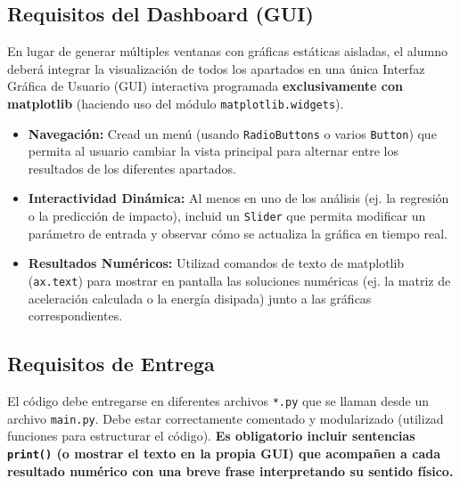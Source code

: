 	\subsection*{Requisitos del Dashboard (GUI)}
	En lugar de generar múltiples ventanas con gráficas estáticas aisladas, el alumno deberá integrar la visualización de todos los apartados en una única Interfaz Gráfica de Usuario (GUI) interactiva programada \textbf{exclusivamente con matplotlib} (haciendo uso del módulo \texttt{matplotlib.widgets}).
	\begin{itemize}
		\item \textbf{Navegación:} Cread un menú (usando \texttt{RadioButtons} o varios \texttt{Button}) que permita al usuario cambiar la vista principal para alternar entre los resultados de los diferentes apartados.
		\item \textbf{Interactividad Dinámica:} Al menos en uno de los análisis (ej. la regresión o la predicción de impacto), incluid un \texttt{Slider} que permita modificar un parámetro de entrada y observar cómo se actualiza la gráfica en tiempo real.
		\item \textbf{Resultados Numéricos:} Utilizad comandos de texto de matplotlib (\texttt{ax.text}) para mostrar en pantalla las soluciones numéricas (ej. la matriz de aceleración calculada o la energía disipada) junto a las gráficas correspondientes.
	\end{itemize}
	
	\subsection*{Requisitos de Entrega}
	El código debe entregarse en diferentes archivos 
	\texttt{*.py} que se llaman desde un archivo 
	\texttt{main.py}. 
	Debe estar correctamente comentado y modularizado (utilizad funciones para estructurar el código). \textbf{Es obligatorio incluir sentencias \texttt{print()} (o mostrar el texto en la propia GUI) que acompañen a cada resultado numérico con una breve frase interpretando su sentido físico.}
